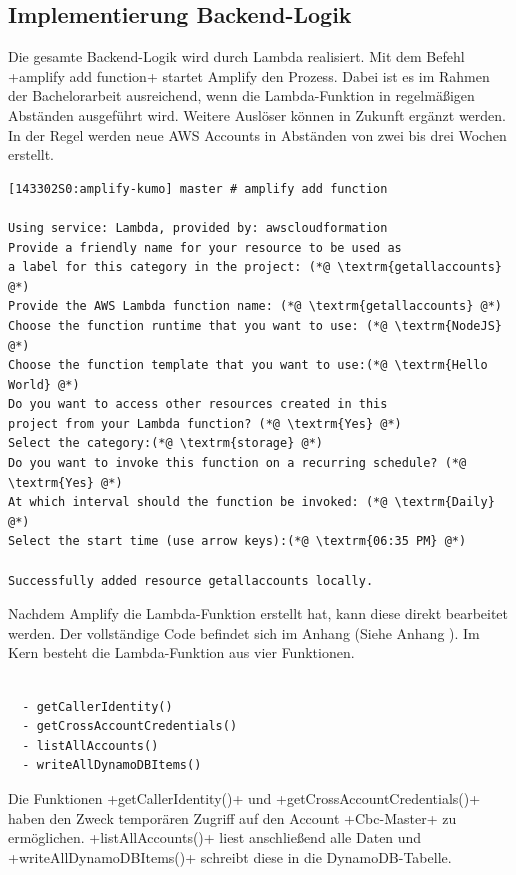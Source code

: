 \clearpage
\subsection{Implementierung Backend-Logik}
\label{ImpLambda}
Die gesamte Backend-Logik wird durch Lambda realisiert.
Mit dem Befehl \spverb+amplify add function+ startet Amplify den Prozess.
Dabei ist es im Rahmen der Bachelorarbeit ausreichend, wenn die Lambda-Funktion in regelmäßigen Abständen ausgeführt wird.
Weitere Auslöser können in Zukunft ergänzt werden.
In der Regel werden neue AWS Accounts in Abständen von zwei bis drei Wochen erstellt.
\\
\begin{lstlisting}[basicstyle=\ttfamily\small, breaklines=true , frame = single, backgroundcolor=\color{flashwhite} ]
[143302S0:amplify-kumo] master # amplify add function

Using service: Lambda, provided by: awscloudformation
Provide a friendly name for your resource to be used as
a label for this category in the project: (*@ \textrm{getallaccounts} @*)
Provide the AWS Lambda function name: (*@ \textrm{getallaccounts} @*)
Choose the function runtime that you want to use: (*@ \textrm{NodeJS} @*)
Choose the function template that you want to use:(*@ \textrm{Hello World} @*)
Do you want to access other resources created in this
project from your Lambda function? (*@ \textrm{Yes} @*)
Select the category:(*@ \textrm{storage} @*)
Do you want to invoke this function on a recurring schedule? (*@ \textrm{Yes} @*)
At which interval should the function be invoked: (*@ \textrm{Daily} @*)
Select the start time (use arrow keys):(*@ \textrm{06:35 PM} @*)

Successfully added resource getallaccounts locally.
\end{lstlisting}

Nachdem Amplify die Lambda-Funktion erstellt hat, kann diese direkt bearbeitet werden.
Der vollständige Code befindet sich im Anhang (Siehe Anhang \textit{}).
Im Kern besteht die Lambda-Funktion aus vier Funktionen.
\\

\begin{lstlisting}[basicstyle=\ttfamily\small, breaklines=true]

  - getCallerIdentity()
  - getCrossAccountCredentials()
  - listAllAccounts()
  - writeAllDynamoDBItems()
\end{lstlisting}

Die Funktionen \spverb+getCallerIdentity()+ und \spverb+getCrossAccountCredentials()+ haben den Zweck temporären Zugriff auf den Account \spverb+Cbc-Master+ zu ermöglichen. \cite[Letzter Absatz]{Stackoverflow}
\spverb+listAllAccounts()+ liest anschließend alle Daten und \spverb+writeAllDynamoDBItems()+ schreibt diese in die DynamoDB-Tabelle.


